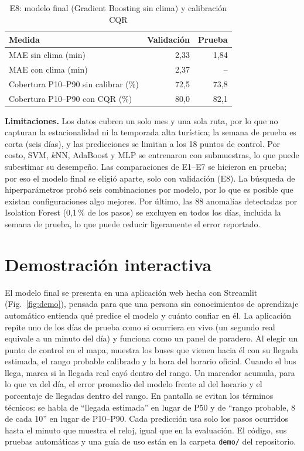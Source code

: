 \documentclass[conference,a4paper]{IEEEtran}
\begin{document}
\begin{table}[t]
\centering
\caption{E8: modelo final (Gradient Boosting sin clima) y calibración CQR}
\label{tab:final}
\footnotesize
\begin{tabular}{@{}lrr@{}}
\toprule
Medida & Validación & Prueba \\
\midrule
MAE sin clima (min) & 2,33 & 1,84 \\
MAE con clima (min) & 2,37 & -- \\
Cobertura P10--P90 sin calibrar (\%) & 72,5 & 73,8 \\
Cobertura P10--P90 con CQR (\%) & 80,0 & 82,1 \\
\bottomrule
\end{tabular}
\end{table}

\textbf{Limitaciones.} Los datos cubren un solo mes y una sola ruta, por lo que no capturan la estacionalidad ni la temporada alta turística; la semana de prueba es corta (seis días), y las predicciones se limitan a los 18 puntos de control. Por costo, SVM, $k$NN, AdaBoost y MLP se entrenaron con submuestras, lo que puede subestimar su desempeño. Las comparaciones de E1--E7 se hicieron en prueba; por eso el modelo final se eligió aparte, solo con validación (E8). La búsqueda de hiperparámetros probó seis combinaciones por modelo, por lo que es posible que existan configuraciones algo mejores. Por último, las 88 anomalías detectadas por Isolation Forest (0,1\,\% de los pasos) se excluyen en todos los días, incluida la semana de prueba, lo que puede reducir ligeramente el error reportado.

\section{Demostración interactiva}
El modelo final se presenta en una aplicación web hecha con Streamlit (Fig.~\ref{fig:demo}), pensada para que una persona sin conocimientos de aprendizaje automático entienda qué predice el modelo y cuánto confiar en él. La aplicación repite uno de los días de prueba como si ocurriera en vivo (un segundo real equivale a un minuto del día) y funciona como un panel de paradero. Al elegir un punto de control en el mapa, muestra los buses que vienen hacia él con su llegada estimada, el rango probable calibrado y la hora del horario oficial. Cuando el bus llega, marca si la llegada real cayó dentro del rango. Un marcador acumula, para lo que va del día, el error promedio del modelo frente al del horario y el porcentaje de llegadas dentro del rango. En pantalla se evitan los términos técnicos: se habla de ``llegada estimada'' en lugar de P50 y de ``rango probable, 8 de cada 10'' en lugar de P10--P90. Cada predicción usa solo los pasos ocurridos hasta el minuto que muestra el reloj, igual que en la evaluación. El código, sus pruebas automáticas y una guía de uso están en la carpeta \texttt{demo/} del repositorio.
\end{document}
